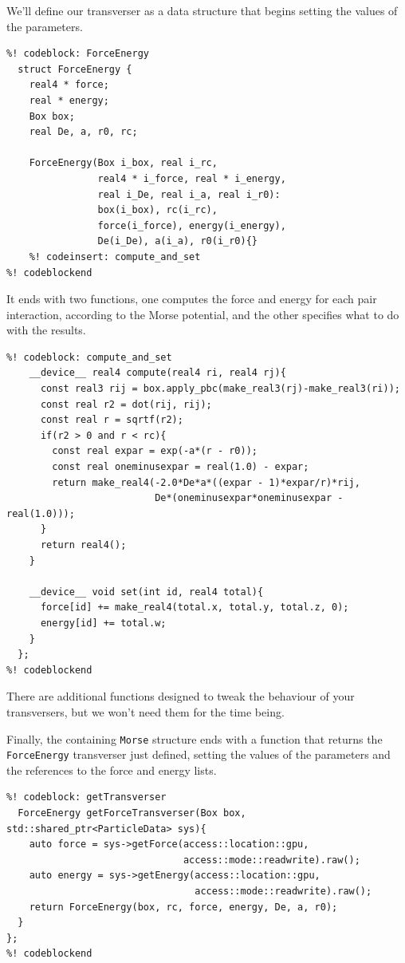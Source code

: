 We'll define our transverser as a data structure that begins setting the values
of the parameters.
\begin{lstlisting}
%! codeblock: ForceEnergy
  struct ForceEnergy {
    real4 * force;
    real * energy;
    Box box;
    real De, a, r0, rc;

    ForceEnergy(Box i_box, real i_rc,
                real4 * i_force, real * i_energy,
                real i_De, real i_a, real i_r0):
                box(i_box), rc(i_rc),
                force(i_force), energy(i_energy),
                De(i_De), a(i_a), r0(i_r0){}
    %! codeinsert: compute_and_set
%! codeblockend
\end{lstlisting}
It ends with two functions, one computes the force and energy for each pair 
interaction, according to the Morse potential, and the other specifies what to 
do with the results.
\begin{lstlisting}
%! codeblock: compute_and_set
    __device__ real4 compute(real4 ri, real4 rj){
      const real3 rij = box.apply_pbc(make_real3(rj)-make_real3(ri));
      const real r2 = dot(rij, rij);
      const real r = sqrtf(r2);
      if(r2 > 0 and r < rc){
        const real expar = exp(-a*(r - r0));
        const real oneminusexpar = real(1.0) - expar;
        return make_real4(-2.0*De*a*((expar - 1)*expar/r)*rij,
                          De*(oneminusexpar*oneminusexpar - real(1.0)));
      }
      return real4();
    }

    __device__ void set(int id, real4 total){
      force[id] += make_real4(total.x, total.y, total.z, 0);
      energy[id] += total.w;
    }
  };
%! codeblockend
\end{lstlisting}
There are additional functions designed to tweak the behaviour of your 
transversers, but we won't need them for the time being.

Finally, the containing \texttt{Morse} structure ends with a function that 
returns the \texttt{ForceEnergy} transverser just defined, setting the values of 
the parameters and the references to the force and energy lists.
\begin{lstlisting}
%! codeblock: getTransverser
  ForceEnergy getForceTransverser(Box box, std::shared_ptr<ParticleData> sys){
    auto force = sys->getForce(access::location::gpu,
                               access::mode::readwrite).raw();
    auto energy = sys->getEnergy(access::location::gpu,
                                 access::mode::readwrite).raw();
    return ForceEnergy(box, rc, force, energy, De, a, r0);
  }
};
%! codeblockend
\end{lstlisting}

